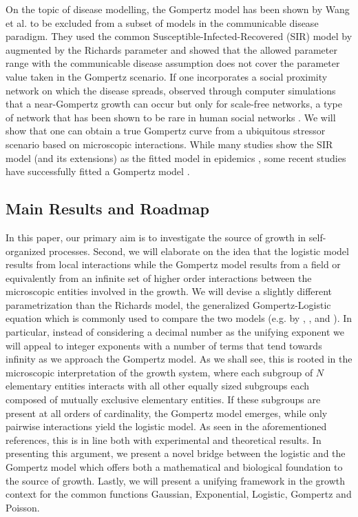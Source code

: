 \documentclass{article}
\begin{document}
On the topic of disease modelling, the Gompertz model has been shown by Wang et al. \cite{wang2012richards} to be excluded from a subset of models in the communicable disease paradigm. They used the common Susceptible-Infected-Recovered (SIR) model by \citet{kermack1927contribution} augmented by the Richards parameter and showed that the allowed parameter range with the communicable disease assumption does not cover the parameter value taken in the Gompertz scenario. If one incorporates a social proximity network on which the disease spreads, \citet{zonta2022virus} observed through computer simulations that a near-Gompertz growth can occur but only for scale-free networks, a type of network that has been shown to be rare in human social networks \cite{clauset2009power,broido2019scale,holme2019rare}. 
We will show that one can obtain a true Gompertz curve from a ubiquitous stressor scenario based on microscopic interactions.
While many studies show the SIR model (and its extensions) as the fitted model in epidemics \cite{carletti2020covid,cooper2020sir,postnikov2020estimation,munoz2021sir,cooper2022dynamical,saikia2021covid}, some recent studies have successfully fitted a Gompertz model \cite{Ohnishi2020,Rypdal2020,Catala2020,rodrigues2020monte,Levitt2020}.

\subsection{Main Results and Roadmap}
In this paper, our primary aim is to investigate the source of growth in self-organized processes. Second, we will elaborate on the idea that the logistic model results from local interactions while the Gompertz model results from a field or equivalently from an infinite set of higher order interactions between the microscopic entities involved in the growth. We will devise a slightly different parametrization than the Richards model, the generalized Gompertz-Logistic equation which is commonly used to compare the two models (e.g. by \citet{petroni2020logistic}, \citet{tjorve2017use}, and \citet{wang2012richards}). In particular, instead of considering a decimal number as the unifying exponent we will appeal to integer exponents with a number of terms that tend towards infinity as we approach the Gompertz model. As we shall see, this is rooted in the microscopic interpretation of the growth system, where each subgroup of $N$ elementary entities interacts with all other equally sized subgroups each composed of mutually exclusive elementary entities. If these subgroups are present at all orders of cardinality, the Gompertz model emerges, while only pairwise interactions yield the logistic model. As seen in the aforementioned references, this is in line both with experimental and theoretical results. In presenting this argument, we present a novel bridge between the logistic and the Gompertz model which offers both a mathematical and biological foundation to the source of growth. Lastly, we will present a unifying framework in the growth context for the common functions Gaussian, Exponential, Logistic, Gompertz and Poisson.
\end{document}
